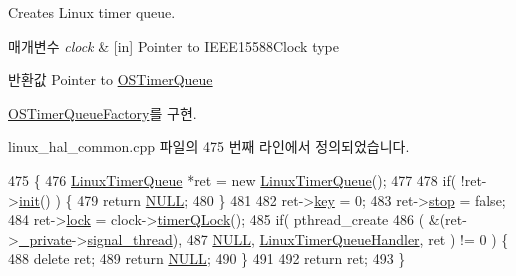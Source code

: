 Creates Linux timer queue. 


\begin{DoxyParams}{매개변수}
{\em clock} & \mbox{[}in\mbox{]} Pointer to I\+E\+E\+E15588\+Clock type \\
\hline
\end{DoxyParams}
\begin{DoxyReturn}{반환값}
Pointer to \hyperlink{class_o_s_timer_queue}{O\+S\+Timer\+Queue} 
\end{DoxyReturn}


\hyperlink{class_o_s_timer_queue_factory_a6ef36ae2e4e33a6683ee412f06af7a85}{O\+S\+Timer\+Queue\+Factory}를 구현.



linux\+\_\+hal\+\_\+common.\+cpp 파일의 475 번째 라인에서 정의되었습니다.


\begin{DoxyCode}
475                              \{
476     \hyperlink{class_linux_timer_queue}{LinuxTimerQueue} *ret = \textcolor{keyword}{new} \hyperlink{class_linux_timer_queue}{LinuxTimerQueue}();
477 
478     \textcolor{keywordflow}{if}( !ret->\hyperlink{class_linux_timer_queue_aee8048628ff2b5c026c9e15acdcaacb8}{init}() ) \{
479         \textcolor{keywordflow}{return} \hyperlink{openavb__types__base__pub_8h_a070d2ce7b6bb7e5c05602aa8c308d0c4}{NULL};
480     \}
481 
482     ret->\hyperlink{class_linux_timer_queue_a35af0be900467fedbb610bd6ea65ed78}{key} = 0;
483     ret->\hyperlink{class_linux_timer_queue_a53a2d16dac430353052f49aaa0cce34a}{stop} = \textcolor{keyword}{false};
484     ret->\hyperlink{class_linux_timer_queue_abdb6f223dacf8c3cf12e918dd48ed210}{lock} = clock->\hyperlink{class_i_e_e_e1588_clock_ac31b9a392fb3fd552253c32df6bf061f}{timerQLock}();
485     \textcolor{keywordflow}{if}( pthread\_create
486         ( &(ret->\hyperlink{class_linux_timer_queue_a7bb3221b5cf50ce69a938da040601c1b}{\_private}->\hyperlink{struct_linux_timer_queue_private_a62d0a2e78babe1e8a32b2a09a5d4e197}{signal\_thread}),
487           \hyperlink{openavb__types__base__pub_8h_a070d2ce7b6bb7e5c05602aa8c308d0c4}{NULL}, \hyperlink{linux__hal__common_8cpp_a57b16fcbb008bbb516e808c2d9e86bf9}{LinuxTimerQueueHandler}, ret ) != 0 ) \{
488         \textcolor{keyword}{delete} ret;
489         \textcolor{keywordflow}{return} \hyperlink{openavb__types__base__pub_8h_a070d2ce7b6bb7e5c05602aa8c308d0c4}{NULL};
490     \}
491 
492     \textcolor{keywordflow}{return} ret;
493 \}
\end{DoxyCode}


